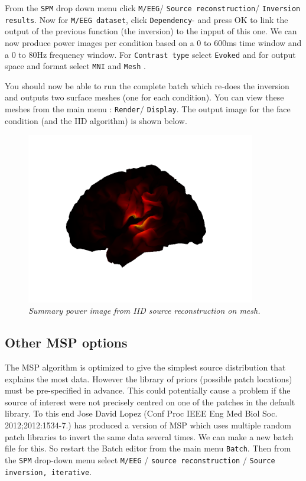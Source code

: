 From the \texttt{SPM} drop down menu click \texttt{M/EEG}/  \texttt{Source reconstruction}/  \texttt{Inversion results}. Now for \texttt{M/EEG dataset}, click \texttt{Dependency}- and press OK to link the output of the previous function (the inversion) to the inpput of this one. We can now produce power images per condition based on a 0 to 600ms time window and a 0 to 80Hz frequency window. For \texttt{Contrast type} select \texttt{Evoked} and for output space and format select \texttt{MNI} and  \texttt{Mesh} .

You should now be able to run the complete batch which re-does the inversion and outputs two surface meshes (one for each condition). You can view these meshes from the main menu : \texttt{Render}/ \texttt{Display}. The output image for the face condition (and the IID algorithm) is shown below. 


\begin{figure}
\begin{center}
\includegraphics[width=100mm]{meg_sloc/slide7}
\caption{\em Summary power image from IID source reconstruction on mesh.\label{meg_sloc:fig:7}}
\end{center}
\end{figure}


\subsection{Other MSP options}

The MSP algorithm is optimized to give the simplest source distribution that explains the most data. However the library of priors (possible patch locations) must be pre-specified in advance. This could potentially cause a problem if the source of interest were not precisely centred on one of the patches in the default library. To this end Jose David Lopez (Conf Proc IEEE Eng Med Biol Soc. 2012;2012:1534-7.) has produced a version of MSP which uses multiple random patch libraries to invert the same data several times. 
We can make a new batch file for this. So restart the Batch editor from the main menu \texttt{Batch}. Then from the \texttt{SPM} drop-down menu select \texttt{M/EEG} /  \texttt{source reconstruction} / \texttt{Source inversion, iterative}.

